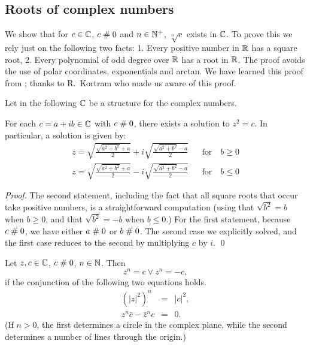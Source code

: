 \subsection{Roots of complex numbers}
We show that for $c \in\mathbb{C}$, $c \mathrel{\#} 0$ and $n\in\mathbb{N}^+$, $\sqrt[n]{c}$
exists in $\mathbb{C}$.
To prove this we rely just on the following two facts: 1. Every
positive number in $\mathbb{R}$ has a square root, 2. Every
polynomial of odd degree over $\mathbb{R}$ has a root in $\mathbb{R}$.
The proof avoids the use of polar coordinates, exponentials and
arctan. We have learned this proof from \cite{Litt41}; thanks to R.\
Kortram who made us aware of this proof. 

Let in the following $\mathbb{C}$ be a structure for the complex numbers. 

\begin{lemma}
For each $c = a+ib \in\mathbb{C}$ with $c \mathrel{\#} 0$, there exists a solution to
$z^2 = c$. In particular, 
a solution is given by:
\begin{eqnarray*}
  z = \sqrt{\frac{\sqrt{a^2 + b^2} +a}{2}} + i
  \sqrt{\frac{\sqrt{a^2 + b^2} -a}{2}}&&\mbox{for}\quad b \geq 0\\
  z = \sqrt{\frac{\sqrt{a^2 + b^2} +a}{2}} - i
  \sqrt{\frac{\sqrt{a^2 + b^2} -a}{2}}&&\mbox{for}\quad b \leq 0
\end{eqnarray*}
\end{lemma}

\begin{proof}
The second statement, including the fact that all square roots that
occur take positive numbers, is a straightforward computation
(using that $\sqrt{b^2} = b$ when $b\geq 0$, and that $\sqrt{b^2} = -b$ when
$b\leq 0$.)
For the first statement, because $c \mathrel{\#} 0$, we have either $a \mathrel{\#} 0$ or
$b \mathrel{\#} 0$.  The second case we explicitly solved, and the first
case reduces to the second by multiplying $c$ by $i$.
\qed
\end{proof}

\begin{lemma}\label{lemCrootequiv}
Let $z, c\in\mathbb{C}$, $c\mathrel{\#} 0$, $n\in\mathbb{N}$. Then
$$z^n = c \vee z^n = -c,$$
if the conjunction of the following two equations holds.
  \begin{eqnarray}
    (|z|^2)^n &=& |c|^2,\\
    z^n \bar{c} - \bar{z}^n c &=&0.
  \end{eqnarray}
(If $n>0$, the first determines a circle in the complex plane,
while the second determines a number of lines through the origin.)
\end{lemma}

